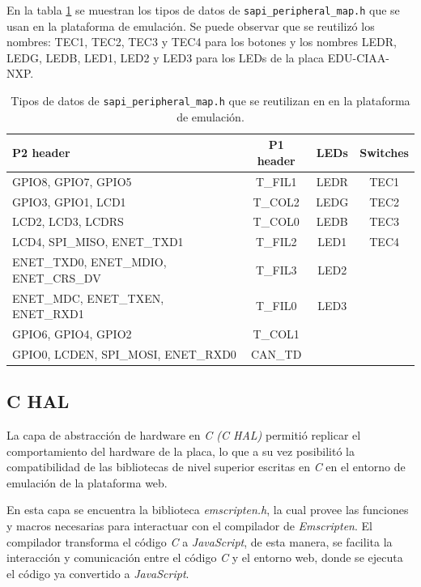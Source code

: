 En la tabla \ref{tab:ConfiguracionGPIO} se muestran los tipos de datos de \texttt{sapi\_peripheral\_map.h} que se usan en la plataforma de emulación. Se puede observar que se reutilizó los nombres: TEC1, TEC2, TEC3 y TEC4 para los botones y los nombres LEDR, LEDG, LEDB, LED1, LED2 y LED3 para los LEDs de la placa EDU-CIAA-NXP.

\begin{table}[h]
	\centering
	\caption[\texttt{sapi\_peripheral\_map.h}.]{Tipos de datos de \texttt{sapi\_peripheral\_map.h} que se reutilizan en en la plataforma de emulación.}
	\begin{tabular}{l c c c}    
		\toprule
		\textbf{P2 header} & \textbf{P1 header} & \textbf{LEDs}  & \textbf{Switches}\\
		\midrule
		GPIO8, GPIO7, GPIO5 & T\_FIL1 &  LEDR &  TEC1\\		
		GPIO3, GPIO1, LCD1 & T\_COL2  & LEDG &  TEC2\\
		LCD2, LCD3, LCDRS & T\_COL0 & LEDB &  TEC3\\
		LCD4, SPI\_MISO, ENET\_TXD1 & T\_FIL2 & LED1 & TEC4\\
		ENET\_TXD0, ENET\_MDIO, ENET\_CRS\_DV & T\_FIL3 & LED2 & \\
	    ENET\_MDC, ENET\_TXEN, ENET\_RXD1 & T\_FIL0 & LED3 & \\
	    GPIO6, GPIO4, GPIO2 & T\_COL1&  & \\
	    GPIO0, LCDEN, SPI\_MOSI, ENET\_RXD0 & CAN\_TD&  & \\
		\bottomrule
		\hline
	\end{tabular}
	\label{tab:ConfiguracionGPIO}
\end{table}






\subsection{C HAL}

La capa de abstracción de hardware en \textit{C (C HAL)}  permitió replicar el comportamiento del hardware de la placa, lo que a su vez posibilitó la compatibilidad de las bibliotecas de nivel superior escritas en \textit{C} en el entorno de emulación de la plataforma web.

En esta capa se encuentra la biblioteca \textit{emscripten.h}, la cual provee las funciones y macros necesarias para interactuar con el compilador de \textit{Emscripten}. El compilador transforma el código \textit{C} a \textit{JavaScript}, de esta manera, se facilita la interacción y comunicación entre el código \textit{C} y el entorno web, donde se ejecuta el código ya convertido a \textit{JavaScript}.


